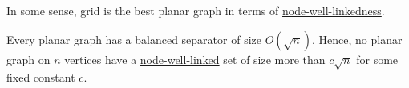 In some sense, grid is the best planar graph in terms of \hyperref[def:node-well-linked]{node-well-linkedness}.

\begin{theorem}
	Every planar graph has a balanced separator of size \(O(\sqrt{n} )\). Hence, no planar graph on \(n\) vertices have a \hyperref[def:node-well-linked]{node-well-linked} set of size more than \(c \sqrt{n} \) for some fixed constant \(c\).
\end{theorem}

